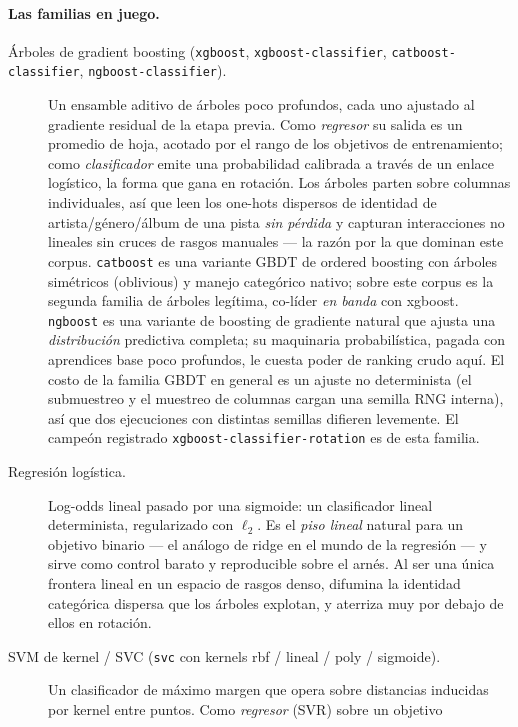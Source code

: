 \documentclass[11pt]{article}
\begin{document}
\paragraph{Las familias en juego.}
\begin{description}
  \item[Árboles de gradient boosting (\texttt{xgboost},
  \texttt{xgboost-classifier}, \texttt{catboost-classifier},
  \texttt{ngboost-classifier}).]
  Un ensamble aditivo de árboles poco profundos, cada uno ajustado al gradiente
  residual de la etapa previa. Como \emph{regresor} su salida es un promedio de
  hoja, acotado por el rango de los objetivos de entrenamiento; como
  \emph{clasificador} emite una probabilidad calibrada a través de un enlace
  logístico, la forma que gana en rotación. Los árboles parten sobre columnas
  individuales, así que leen los one-hots dispersos de identidad de
  artista/género/álbum de una pista \emph{sin pérdida} y capturan interacciones
  no lineales sin cruces de rasgos manuales --- la razón por la que dominan este
  corpus. \texttt{catboost} es una variante GBDT de ordered boosting con árboles
  simétricos (oblivious) y manejo categórico nativo; sobre este corpus es la
  segunda familia de árboles legítima, co-líder \emph{en banda} con xgboost.
  \texttt{ngboost} es una variante de boosting de gradiente natural que ajusta
  una \emph{distribución} predictiva completa; su maquinaria probabilística,
  pagada con aprendices base poco profundos, le cuesta poder de ranking crudo
  aquí. El costo de la familia GBDT en general es un ajuste no determinista (el
  submuestreo y el muestreo de columnas cargan una semilla RNG interna), así que
  dos ejecuciones con distintas semillas difieren levemente. El campeón
  registrado \texttt{xgboost-classifier-rotation} es de esta familia.
  \item[Regresión logística.] Log-odds lineal pasado por una sigmoide: un
  clasificador lineal determinista, regularizado con $\ell_2$. Es el
  \emph{piso lineal} natural para un objetivo binario --- el análogo de ridge en
  el mundo de la regresión --- y sirve como control barato y reproducible sobre
  el arnés. Al ser una única frontera lineal en un espacio de rasgos denso,
  difumina la identidad categórica dispersa que los árboles explotan, y aterriza
  muy por debajo de ellos en rotación.
  \item[SVM de kernel / SVC (\texttt{svc} con kernels rbf / lineal / poly /
  sigmoide).] Un clasificador de máximo margen que opera sobre distancias
  inducidas por kernel entre puntos. Como \emph{regresor} (SVR) sobre un objetivo

\end{description}
\end{document}
